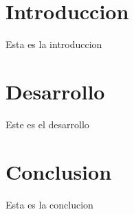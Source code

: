 \documentclass[hidelinks,12pt]{article}
\begin{document}
\vspace{3cm}
\  \\
\
\tableofcontents
\newpage



\section{Introduccion}
Esta es la introduccion
\newpage


\section{Desarrollo}
Este es el desarrollo
\newpage


\section{Conclusion}
Esta es la conclucion
\newpage



\end{document}
